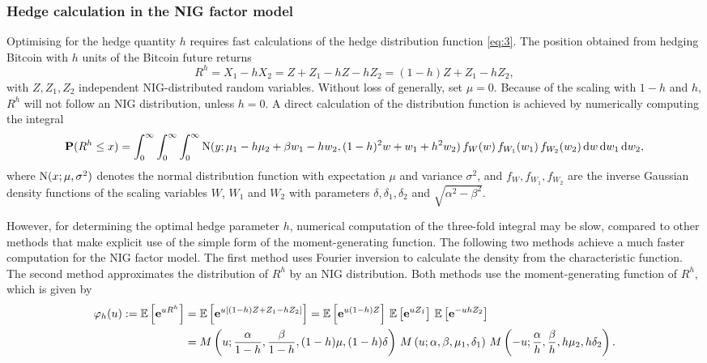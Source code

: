 \subsubsection{Hedge calculation in the NIG factor model}
\label{sec:hedge-calc-nig}

Optimising for the hedge quantity $h$ requires fast calculations of
the hedge distribution function \eqref{eq:3}. The position obtained
from hedging Bitcoin with $h$ units of the Bitcoin future returns
\begin{equation*}
  R^h = X_1 - h X_2 = Z + Z_1 - h Z - h Z_2 = (1-h) Z + Z_1 - h Z_2,
\end{equation*}
with $Z, Z_1, Z_2$ independent NIG-distributed random
variables. Without loss of generally, set $\mu=0$. Because of the
scaling with $1-h$ and $h$, $R^h$ will not follow an NIG distribution,
unless $h=0$.  A direct calculation of the distribution function is
achieved by numerically computing the integral
\begin{equation*}
  {\bf P}(R^h\leq x) = \int_0^\infty \int_0^\infty \int_0^\infty
  {\rm N}(y; \mu_1 - h \mu_2 + \beta w_1 - h w_2, (1-h)^2 w + w_1 + h^2
  w_2)\, f_W(w)\, f_{W_1}(w_1)\, f_{W_2} (w_2)\, {\rm d} w\, {\rm d} w_1\, {\rm d} w_2,
\end{equation*}
where ${\rm N}(x; \mu, \sigma^2)$ denotes the normal distribution
function with expectation $\mu$ and variance $\sigma^2$, and
$f_W, f_{W_1}, f_{W_2}$ are the inverse Gaussian density functions of the
scaling variables $W$, $W_1$ and $W_2$ with parameters
$\delta, \delta_1, \delta_2$ and $\sqrt{\alpha^2-\beta^2}$. 

However, for determining the optimal hedge parameter $h$, numerical
computation of the three-fold integral may be slow, compared to other
methods that make explicit use of the simple form of the
moment-generating function.  The following two methods achieve a much
faster computation for the NIG factor model.  The first method uses
Fourier inversion to calculate the density from the characteristic
function. The second method approximates the distribution of $R^h$ by
an NIG distribution.  Both methods use the moment-generating function
of $R^h$, which is given by
\begin{align}
  \varphi_h(u):=\E\left[\e^{u R^h}\right]
  &= \E\left[ \e^{u[(1-h) Z + Z_1 -h Z_2]}\right] %
    = \E\left[ \e^{u(1-h) Z}\right]\, \E\left[ \e^{u Z_1}\right] \,
    \E\left[ \e^{-u h Z_2}\right]\nonumber\\
  &=M\left(u;\frac{\alpha}{1-h}, \frac{\beta}{1-h}, (1-h)\mu,
    (1-h)\delta\right)\,
    M\left(u; \alpha, \beta, \mu_1, \delta_1\right)\,
    M\left(-u; \frac{\alpha}{h}, \frac{\beta}{h}, h\mu_2,
    h\delta_2\right).
    \label{eq:7}
\end{align}


